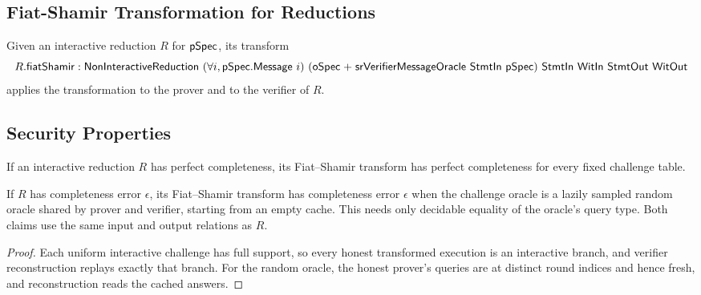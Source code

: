 \subsection{Fiat-Shamir Transformation for Reductions}\label{sec:fiat_shamir_reduction}

\begin{definition}
    \label{def:reduction_fiat_shamir}
    Given an interactive reduction $R$ for $\mathsf{pSpec}$, its transform
    \[ R.\mathsf{fiatShamir} : \NonInteractiveReduction\ (\forall i, \pSpec.\Message\ i)\ (\oSpec \mathrel{+} \mathsf{srVerifierMessageOracle}\ \StmtIn\ \pSpec)\ \StmtIn\ \WitIn\ \StmtOut\ \WitOut \]
    applies the transformation to the prover and to the verifier of $R$.
    \leanok
\end{definition}

\subsection{Security Properties}\label{sec:fiat_shamir_security}

\begin{theorem}
    \label{thm:fiat_shamir_completeness}
    If an interactive reduction $R$ has perfect completeness, its Fiat--Shamir transform has
    perfect completeness for every fixed challenge table.

    If $R$ has completeness error $\epsilon$, its Fiat--Shamir transform has completeness error
    $\epsilon$ when the challenge oracle is a lazily sampled random oracle shared by prover and
    verifier, starting from an empty cache. This needs only decidable equality of the oracle's
    query type. Both claims use the same input and output relations as $R$.
    \leanok
\end{theorem}
\begin{proof}
    \leanok
    Each uniform interactive challenge has full support, so every honest transformed execution is
    an interactive branch, and verifier reconstruction replays exactly that branch. For the random
    oracle, the honest prover's queries are at distinct round indices and hence fresh, and
    reconstruction reads the cached answers.
\end{proof}

